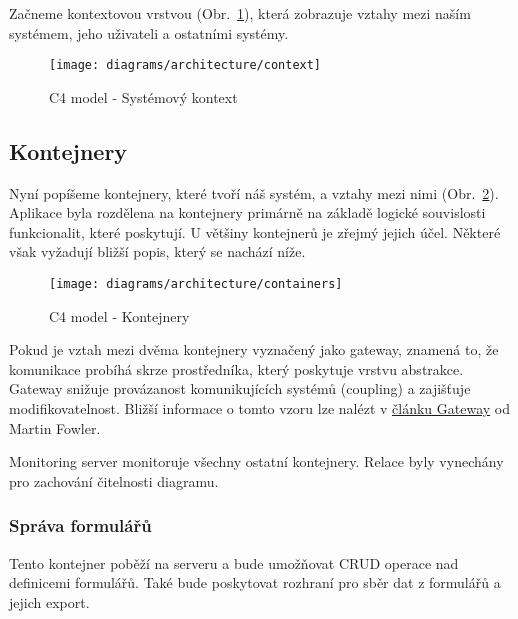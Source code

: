 Začneme kontextovou vrstvou (Obr.~\ref{fig:architecture-context}), která zobrazuje vztahy mezi naším systémem, jeho uživateli a ostatními systémy.

\begin{figure}[H]
    \centering
    \texttt{[image: diagrams/architecture/context]}
    \caption{C4 model - Systémový kontext}\label{fig:architecture-context}
\end{figure}

\subsection{Kontejnery}\label{subsec:kontejnery}

Nyní popíšeme kontejnery, které tvoří náš systém, a vztahy mezi nimi (Obr.~\ref{fig:architecture-containers}).
Aplikace byla rozdělena na kontejnery primárně na základě logické souvislosti funkcionalit, které poskytují.
U většiny kontejnerů je zřejmý jejich účel.
Některé však vyžadují bližší popis, který se nachází níže.

\begin{figure}[H]
    \centering
    \texttt{[image: diagrams/architecture/containers]}
    \caption{C4 model - Kontejnery}\label{fig:architecture-containers}
\end{figure}

\begin{tcolorbox}
    Pokud je vztah mezi dvěma kontejnery vyznačený jako gateway, znamená to, že komunikace probíhá skrze prostředníka, který poskytuje vrstvu abstrakce.
    Gateway snižuje provázanost komunikujících systémů (coupling) a zajišťuje modifikovatelnost.
    Bližší informace o tomto vzoru lze nalézt v \href{https://martinfowler.com/articles/gateway-pattern.html}{článku Gateway} od Martin Fowler.
\end{tcolorbox}

\begin{tcolorbox}
    Monitoring server monitoruje všechny ostatní kontejnery.
    Relace byly vynechány pro zachování čitelnosti diagramu.
\end{tcolorbox}

\subsubsection{Správa formulářů}\label{subsubsec:sprava-formularu}

Tento kontejner poběží na serveru a bude umožňovat CRUD\footnotemark{} operace nad definicemi formulářů.
Také bude poskytovat rozhraní pro sběr dat z formulářů a jejich export.

